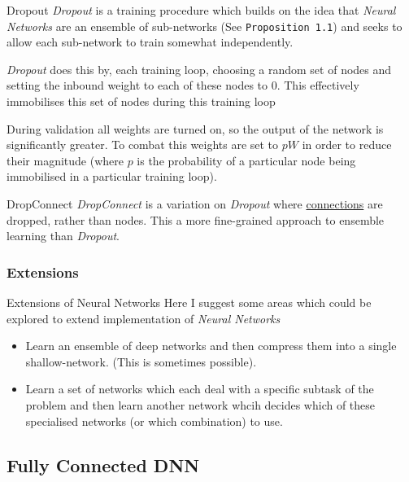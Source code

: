 \documentclass[11pt,a4paper]{article}
\begin{document}
  \begin{definition}{Dropout}
    \textit{Dropout} is a training procedure which builds on the idea that \textit{Neural Networks} are an ensemble of sub-networks (See \texttt{Proposition 1.1}) and seeks to allow each sub-network to train somewhat independently.
    \par \textit{Dropout} does this by, each training loop, choosing a random set of nodes and setting the inbound weight to each of these nodes to 0. This effectively immobilises this set of nodes during this training loop
    \par During validation all weights are turned on, so the output of the network is significantly greater. To combat this weights are set to $pW$ in order to reduce their magnitude (where $p$ is the probability of a particular node being immobilised in a particular training loop).
  \end{definition}

  \begin{definition}{DropConnect}
    \textit{DropConnect} is a variation on \textit{Dropout} where \underline{connections} are dropped, rather than nodes. This a more fine-grained approach to ensemble learning than \textit{Dropout}.
  \end{definition}

\subsubsection{Extensions}

  \begin{proposition}{Extensions of Neural Networks}
    Here I suggest some areas which could be explored to extend implementation of \textit{Neural Networks}
    \begin{itemize}
      \item Learn an ensemble of deep networks and then compress them into a single shallow-network. (This is sometimes possible).
      \item Learn a set of networks which each deal with a specific subtask of the problem and then learn another network whcih decides which of these specialised networks (or which combination) to use.
    \end{itemize}
  \end{proposition}

\subsection{Fully Connected DNN}
\end{document}
